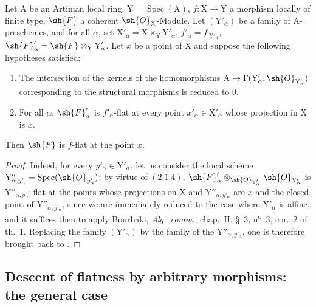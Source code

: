 \begin{corollary}[11.4.13]
\label{IV.11.4.13}
Let $\mathrm{A}$ be an Artinian local ring, $\mathrm{Y}=\operatorname{Spec}(\mathrm{A})$, $f:\mathrm{X}\to\mathrm{Y}$ a
morphism locally of finite type, $\sh{F}$ a coherent $\sh{O}_\mathrm{X}$-Module. Let $(\mathrm{Y}'_\alpha)$ be a family of
$\mathrm{A}$-preschemes, and for all $\alpha$, set $\mathrm{X}'_\alpha=\mathrm{X}\times_\mathrm{Y}\mathrm{Y}'_\alpha$, $f'_\alpha=f_{|\mathrm{Y}'_\alpha}$, $\sh{F}'_\alpha=\sh{F}\otimes_\mathrm{Y}\mathrm{Y}'_\alpha$. Let $x$ be a point
of $\mathrm{X}$ and suppose the following hypotheses satisfied:
\begin{enumerate}[label=(\roman*)]
  \item The intersection of the kernels of the homomorphisms $\mathrm{A}\to\Gamma(\mathrm{Y}'_\alpha,\sh{O}_{\mathrm{Y}'_\alpha})$ corresponding to the
  structural morphisms is reduced to $0$.
  \item For all $\alpha$, $\sh{F}'_\alpha$ is $f'_\alpha$-flat at every point $x'_\alpha\in\mathrm{X}'_\alpha$ whose projection in $\mathrm{X}$ is $x$.
\end{enumerate}

Then $\sh{F}$ is $f$-flat at the point $x$.
\end{corollary}

\begin{proof}
Indeed, for every $y'_\alpha\in\mathrm{Y}'_\alpha$, let us consider the local scheme $\mathrm{Y}''_{\alpha,y'_\alpha}=\operatorname{Spec}(\sh{O}_{y'_\alpha})$; by
virtue of $(2.1.4)$, $\sh{F}'_\alpha\otimes_{\sh{O}_{\mathrm{Y}'_\alpha}}\sh{O}_{\mathrm{Y}'_\alpha}$ is $\mathrm{Y}''_{\alpha,y'_\alpha}$-flat at the points whose projections on $\mathrm{X}$ and $\mathrm{Y}''_{\alpha,y'_\alpha}$
are $x$ and the closed point of $\mathrm{Y}''_{\alpha,y'_\alpha}$, since we are immediately reduced
to the case where $\mathrm{Y}'_\alpha$ is affine, and it suffices then to apply Bourbaki, \emph{Alg.\ comm.},
chap.~II, \S~3, n\textsuperscript{o}~3, cor.~2 of th.~1. Replacing the family $(\mathrm{Y}'_\alpha)$ by the family of the $\mathrm{Y}''_{\alpha,y'_\alpha}$,
one is therefore brought back to .
\end{proof}

\subsection{Descent of flatness by arbitrary morphisms: the general case}
\label{subsection:IV.11.5}

